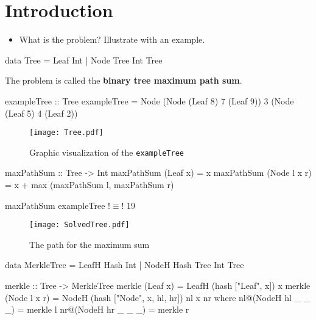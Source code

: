 \section{Introduction}
\begin{itemize}
    \item What is the problem? Illustrate with an example.
\end{itemize}


\begin{haskell}
data Tree = Leaf Int
          | Node Tree Int Tree 
\end{haskell}

The problem is called the \textbf{binary tree maximum path sum}.

\begin{haskell}
exampleTree :: Tree    
exampleTree = Node (Node (Leaf 8) 7 (Leaf 9)) 3 (Node (Leaf 5) 4 (Leaf 2))
\end{haskell}

\begin{figure}[H]
    \centering
    \texttt{[image: Tree.pdf]}
    \caption{Graphic visualization of the \texttt{exampleTree}}
\end{figure}

\begin{haskell}
maxPathSum :: Tree -> Int
maxPathSum (Leaf x)     = x
maxPathSum (Node l x r) = x + max (maxPathSum l, maxPathSum r)

maxPathSum exampleTree !$\equiv$! 19
\end{haskell}

\begin{figure}[H]
    \centering
    \texttt{[image: SolvedTree.pdf]}
    \caption{The path for the maximum sum}
\end{figure}

\begin{haskell}
data MerkleTree = LeafH Hash Int
                | NodeH Hash Tree Int Tree

merkle :: Tree -> MerkleTree
merkle (Leaf x)     = LeafH (hash ["Leaf", x]) x
merkle (Node l x r) = NodeH (hash ["Node", x, hl, hr]) nl x nr
  where
    nl@(NodeH hl _ _ _) = merkle l
    nr@(NodeH hr _ _ _) = merkle r
\end{haskell}

